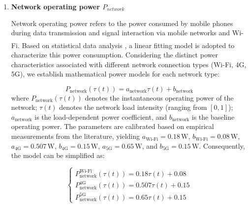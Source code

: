 \documentclass{mcmthesis}  %
\newcommand{\upcite}[1]{\textsuperscript{\textsuperscript{\cite{#1}}}}
\begin{document}
\begin{enumerate}[label=\bfseries\arabic*.]
		In summary, the CPU power consumption model is constructed as follows:
		\begin{equation}
			P_{CPU}(t)=\beta_{freq}u(t)+\beta_{idle}
		\end{equation}
		where $P_{CPU}(t)$ denotes the instantaneous power consumption of the CPU, $u(t)$ is the CPU utilization rate with $u(t)\in[0,1]$, $\beta_{freq}$ is the dynamic power consumption coefficient related to the CPU utilization rate, and $\beta_{idle}$ is the idle power consumption of the CPU. According to the power consumption characteristics of modern mobile phones, we take $\beta_{freq}=0.8\ \text{W}$ and $\beta_{idle}=0.2\ \text{W}$\upcite{5}, then the CPU power consumption model is simplified as:
		\begin{equation}
			P_{CPU}(t)=0.8u(t)+0.2
		\end{equation}
		\item \textbf{Network operating power $P_{network}$}
		
		Network operating power refers to the power consumed by mobile phones during data transmission and signal interaction via mobile networks and Wi-Fi. Based on statistical data analysis \upcite{6}, a linear fitting model is adopted to characterize this power consumption. Considering the distinct power characteristics associated with different network connection types (Wi-Fi, 4G, 5G), we establish mathematical power models for each network type:
		
		\begin{equation}
			P_{\text{network}}(\tau(t)) = a_{\text{network}} \tau(t) + b_{\text{network}}
		\end{equation}
		where $P_{\text{network}}(\tau(t))$ denotes the instantaneous operating power of the network; $\tau(t)$ denotes the network load intensity (ranging from $[0,1]$); $a_{\text{network}}$ is the load-dependent power coefficient, and $b_{\text{network}}$ is the baseline operating power. The parameters are calibrated based on empirical measurements from the literature, yielding $a_{\text{Wi-Fi}}=0.18\,\mathrm{W}$, $b_{\text{Wi-Fi}}=0.08\,\mathrm{W}$, $a_{4\text{G}}=0.507\,\mathrm{W}$, $b_{4\text{G}}=0.15\,\mathrm{W}$, $a_{5\text{G}}=0.65\,\mathrm{W}$, and $b_{5\text{G}}=0.15\,\mathrm{W}$. Consequently, the model can be simplified as:
		
		\begin{equation}
			\begin{cases}
				P_{\text{network}}^{\text{Wi-Fi}}(\tau(t)) = 0.18\tau(t) + 0.08 \\
				P_{\text{network}}^{4\text{G}}(\tau(t)) = 0.507\tau(t) + 0.15 \\
				P_{\text{network}}^{5\text{G}}(\tau(t)) = 0.65\tau(t) + 0.15
			\end{cases}
		\end{equation}
		

\end{enumerate}
\end{document}
